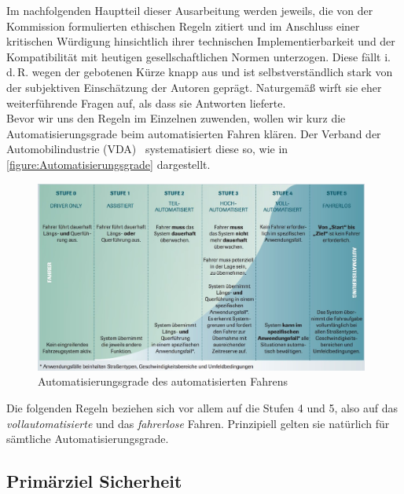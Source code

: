 \documentclass[twoside,a4paper,12pt]{article}
\begin{document}
Im nachfolgenden Hauptteil dieser Ausarbeitung werden jeweils, die von der Kommission formulierten ethischen Regeln zitiert und im Anschluss einer kritischen 
Würdigung hinsichtlich ihrer technischen Implementierbarkeit und der Kompatibilität mit heutigen gesellschaftlichen Normen unterzogen. 
Diese fällt i.\,d.\,R. wegen der gebotenen Kürze knapp aus und ist selbstverständlich
stark von der subjektiven Einschätzung der Autoren geprägt. Naturgemäß wirft sie eher weiterführende Fragen auf, als dass sie Antworten lieferte.\\

Bevor wir uns den Regeln im Einzelnen zuwenden, wollen wir kurz die Automatisierungsgrade beim automatisierten Fahren klären. Der Verband der 
Automobilindustrie (VDA)~\cite{vda} systematisiert diese so, wie in \autoref{figure:Automatisierungsgrade} dargestellt.\\

\begin{figure}[H]
\centering
\includegraphics[width=11cm]{resources/uebersicht-stufen-der-automatisierung.jpg}
\caption[Automatisierungsgrade des automatisierten Fahrens]{Automatisierungsgrade des automatisierten Fahrens~\cite{vda}}
\label{figure:Automatisierungsgrade}
\end{figure}

Die folgenden Regeln beziehen sich vor allem auf die Stufen 4 und 5, also auf das \textit{vollautomatisierte} und das \textit{fahrerlose} Fahren.
Prinzipiell gelten sie natürlich für sämtliche Automatisierungsgrade.

\subsection{Primärziel Sicherheit} \label{PrimaerzielSicherheit}
\end{document}

